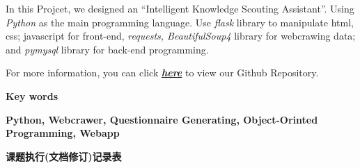 \documentclass[twoside,11pt]{article}
\begin{document}
In this Projcet, we designed an ``Intelligent Knowledge Scouting Assistant''.
Using \emph{Python} as the main programming language. Use \emph{flask} library to manipulate html, css; javascript for front-end, \emph{requests, BeautifulSoup4} library for webcrawing data; and \emph{pymysql} library for back-end programming.

For more information, you can click  \href{https://github.com/Casta-mere/Read-Book}{\textbf{\emph{here}}} to view our Github Repository. \\ \vspace{1.0cm}

\begin{center}
    \Large\textbf{Key words}
\end{center}

\textbf{Python, Webcrawer, Questionnaire Generating, Object-Orinted Programming, Webapp}


\newpage




\begin{center}
    \Large\textbf{课题执行(文档修订)记录表}
\end{center}

\begin{table}[H]
    \centering
    \caption{课题执行(文档修订)记录表}

    \label{tab:tab1}
\end{table}

\newpage



\begin{center}
    \tableofcontents
\end{center}
\thispagestyle{empty}
\newpage



\end{document}
